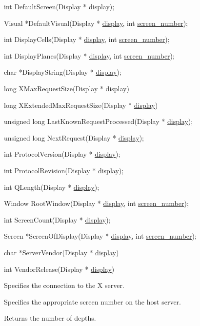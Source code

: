 \documentclass[]{article}
\renewcommand{\emph}[1]{\underline{#1}}
\begin{document}
int DefaultScreen(Display * \emph{display});

Visual *DefaultVisual(Display * \emph{display}, int
\emph{screen\_number});

int DisplayCells(Display * \emph{display}, int \emph{screen\_number});

int DisplayPlanes(Display * \emph{display}, int \emph{screen\_number});

char *DisplayString(Display * \emph{display});

long XMaxRequestSize(Display * \emph{display})

long XExtendedMaxRequestSize(Display * \emph{display})

unsigned long LastKnownRequestProcessed(Display * \emph{display});

unsigned long NextRequest(Display * \emph{display});

int ProtocolVersion(Display * \emph{display});

int ProtocolRevision(Display * \emph{display});

int QLength(Display * \emph{display});

Window RootWindow(Display * \emph{display}, int \emph{screen\_number});

int ScreenCount(Display * \emph{display});

Screen *ScreenOfDisplay(Display * \emph{display}, int
\emph{screen\_number});

char *ServerVendor(Display * \emph{display})

int VendorRelease(Display * \emph{display})


\begin{description}
\itemsep1pt\parskip0pt
\item[\emph{display}]
Specifies the connection to the X server.
\end{description}

\begin{description}
\itemsep1pt\parskip0pt
\item[\emph{screen\_number}]
Specifies the appropriate screen number on the host server.
\end{description}

\begin{description}
\itemsep1pt\parskip0pt
\item[\emph{count\_return}]
Returns the number of depths.
\end{description}
\end{document}
